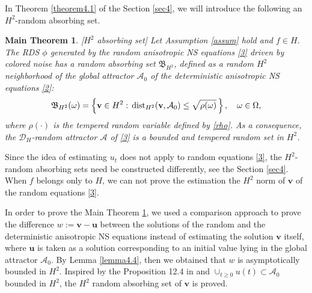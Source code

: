 \documentclass{elsarticle}
\newtheorem{main}{Main Theorem}
\theoremstyle{definition}
\numberwithin{equation}{section}
\newcommand{\A}{\mathcal{A}}
\begin{document}
In  Theorem \ref{theorem4.1} of the Section \ref{sec4}, we  will introduce the following an $H^2$-random absorbing set.
\begin{main}\label{main}[$H^2$ absorbing set]
 Let Assumption \ref{assum} hold and $f\in H$. The  RDS $\phi$ generated by the random  anisotropic  NS equations \eqref{3} driven by colored noise has a  random absorbing set $\mathfrak{B}_{H^2}$, defined as a random $H^2$ neighborhood of the global attractor $\mathcal{A}_0$ of the deterministic anisotropic  NS equations \eqref{2}:
\begin{align}
\mathfrak{B}_{H^2}(\omega)=\left \{\textbf{v}\in H^2: \, {\rm dist}_{H^2}(\textbf{v},\mathcal{A}_{0}) \leq \sqrt{\rho(\omega)} \, \right\}, \quad \omega\in\Omega, \nonumber
\end{align}
where $\rho(\cdot)$ is the tempered random variable defined by \eqref{rho}.  As a consequence, the $\mathcal{D}_H$-random attractor $\mathcal{A}$ of \eqref{3} is a bounded and tempered random set in $H^2$.

\end{main}

Since the  idea of estimating $u_t$  does not apply to random equations \eqref{3},  the $H^2$-random absorbing sets need be constructed differently, see the Section \ref{sec4}. When $f$ belongs only to $H$, we can not prove the estimation the $H^2$ norm of $\textbf{v}$ of the  random equations \eqref{3}.

In order to prove the Main Theorem \ref{main}, we used a comparison approach to prove the difference $w:=\textbf{v}-\textbf{u}$ between the solutions of the random and the deterministic  anisotropic NS equations instead of estimating the solution $\textbf{v}$ itself, where $\textbf{u}$ is taken as a solution corresponding to an initial value lying  in the global attractor $\A_0$. By Lemma \ref{lemma4.4}, then we obtained that $w$ is asymptotically bounded in $H^2$. Inspired by the Proposition 12.4 in \cite{robinson01} and $ \cup_{t\geq 0} u(t) \subset \A_0$  bounded  in $ H^2$, the $H^2$ random absorbing set of $\textbf{v}$ is proved.
\end{document}
